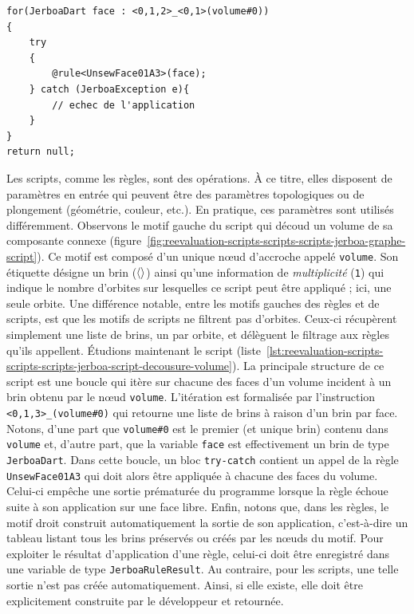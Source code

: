 \begin{lstlisting}[style=script-style,language=jerboa-script,caption=Script de
décousure d'un volume,
label=lst:reevaluation-scripts-scripts-scripts-jerboa-script-decousure-volume,
captionpos=b]
for(JerboaDart face : <0,1,2>_<0,1>(volume#0))
{
    try
    {
        @rule<UnsewFace01A3>(face);
    } catch (JerboaException e){
        // echec de l'application
    }
}
return null;
\end{lstlisting}

Les scripts, comme les règles, sont des opérations. %
À ce titre, elles disposent de paramètres en entrée qui peuvent être des
paramètres topologiques ou de plongement (géométrie, couleur, etc.). %
En pratique, ces paramètres sont utilisés différemment. %
Observons le motif gauche du script qui découd un volume de sa composante
connexe
(figure~\ref{fig:reevaluation-scripts-scripts-scripts-jerboa-graphe-script}). %
Ce motif est composé d'un unique n\oe ud d'accroche appelé \texttt{volume}. %
Son étiquette désigne un brin (\(\langle\rangle\)) ainsi qu'une information de
\textit{multiplicité} (\texttt{{1}}) qui indique le nombre d'orbites sur
lesquelles ce script peut être appliqué ; ici, une seule orbite. %
Une différence notable, entre les motifs gauches des règles et de scripts, est
que les motifs de scripts ne filtrent pas d'orbites. %
Ceux-ci récupèrent simplement une liste de brins, un par orbite, et délèguent le
filtrage aux règles qu'ils appellent. %
Étudions maintenant le script
(liste~\ref{lst:reevaluation-scripts-scripts-scripts-jerboa-script-decousure-volume}). %
La principale structure de ce script est une boucle qui itère sur chacune des faces
d'un volume incident à un brin obtenu par le n\oe ud \texttt{volume}. %
L'itération est formalisée par l'instruction
\texttt{<0,1,3>\_<0,1>(volume\#{}0)} qui retourne une liste de brins à raison
d'un brin par face. %
Notons, d'une part que \texttt{volume\#{}0} est le premier (et unique brin)
contenu dans \texttt{volume} et, d'autre part, que la variable \texttt{face} est
effectivement un brin de type \texttt{JerboaDart}. %
Dans cette boucle, un bloc \texttt{try-catch} contient un appel de la règle
\texttt{UnsewFace01A3} qui doit alors être appliquée à chacune des faces du volume. %
Celui-ci empêche une sortie prématurée du programme lorsque la règle échoue
suite à son application sur une face libre. %
Enfin, notons que, dans les règles, le motif droit construit automatiquement la sortie de son application, c'est-à-dire un tableau listant tous les brins préservés ou créés par les n\oe uds du motif. %
Pour exploiter le résultat d'application d'une règle, celui-ci doit être enregistré dans une variable de type \texttt{JerboaRuleResult}. %
Au contraire, pour les scripts, une telle sortie n'est pas créée automatiquement. %
Ainsi, si elle existe, elle doit être explicitement construite par le développeur et retournée. %

